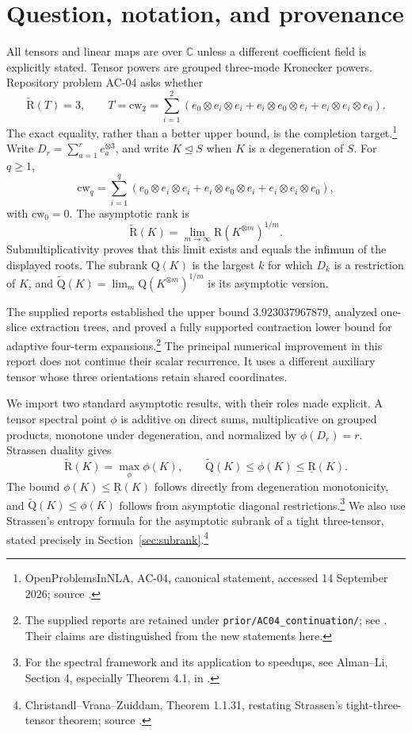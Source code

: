 \documentclass[11pt]{article}
\theoremstyle{definition}\newtheorem{definition}[theorem]{Definition}
\newcommand{\C}{\mathbb C}
\newcommand{\R}{\mathrm R}
\newcommand{\BR}{\underline{\mathrm R}}
\newcommand{\AR}{\widetilde{\mathrm R}}
\newcommand{\AQ}{\widetilde{\mathrm Q}}
\newcommand{\cw}{\mathrm{cw}}
\newcommand{\degen}{\trianglelefteq}
\begin{document}
\section{Question, notation, and provenance}
All tensors and linear maps are over $\C$ unless a different coefficient field is explicitly stated. Tensor powers are grouped three-mode Kronecker powers. Repository problem AC-04 asks whether
\begin{equation}\label{eq:target}
\AR(T)=3,\qquad
T=\cw_2=\sum_{i=1}^{2}
(e_0\otimes e_i\otimes e_i+e_i\otimes e_0\otimes e_i+e_i\otimes e_i\otimes e_0).
\end{equation}
The exact equality, rather than a better upper bound, is the completion target.\footnote{OpenProblemsInNLA, AC-04, canonical statement, accessed 14 September 2026; source \cite{repo}.}
Write $D_r=\sum_{a=1}^r e_a^{\otimes3}$, and write $K\degen S$ when $K$ is a degeneration of $S$. For $q\ge1$,
\[
\cw_q=\sum_{i=1}^{q}
(e_0\otimes e_i\otimes e_i+e_i\otimes e_0\otimes e_i+e_i\otimes e_i\otimes e_0),
\]
with $\cw_0=0$. The asymptotic rank is
\[
\AR(K)=\lim_{m\to\infty}\R(K^{\otimes m})^{1/m}.
\]
Submultiplicativity proves that this limit exists and equals the infimum of the displayed roots. The subrank $\mathrm Q(K)$ is the largest $k$ for which $D_k$ is a restriction of $K$, and $\AQ(K)=\lim_m\mathrm Q(K^{\otimes m})^{1/m}$ is its asymptotic version.

The supplied reports established the upper bound $3.923037967879$, analyzed one-slice extraction trees, and proved a fully supported contraction lower bound for adaptive four-term expansions.\footnote{The supplied reports are retained under \texttt{prior/AC04\_continuation/}; see \cite{prioradaptive,priorinitial,priorlater}. Their claims are distinguished from the new statements here.} The principal numerical improvement in this report does not continue their scalar recurrence. It uses a different auxiliary tensor whose three orientations retain shared coordinates.

We import two standard asymptotic results, with their roles made explicit. A tensor spectral point $\phi$ is additive on direct sums, multiplicative on grouped products, monotone under degeneration, and normalized by $\phi(D_r)=r$. Strassen duality gives
\begin{equation}\label{eq:spectrum}
\AR(K)=\max_\phi\phi(K),\qquad
\AQ(K)\le\phi(K)\le\BR(K).
\end{equation}
The bound $\phi(K)\le\BR(K)$ follows directly from degeneration monotonicity, and $\AQ(K)\le\phi(K)$ follows from asymptotic diagonal restrictions.\footnote{For the spectral framework and its application to speedups, see Alman--Li, Section 4, especially Theorem 4.1, in \cite{almanli}.} We also use Strassen's entropy formula for the asymptotic subrank of a tight three-tensor, stated precisely in Section~\ref{sec:subrank}.\footnote{Christandl--Vrana--Zuiddam, Theorem 1.1.31, restating Strassen's tight-three-tensor theorem; source \cite{cvz}.}
\end{document}

